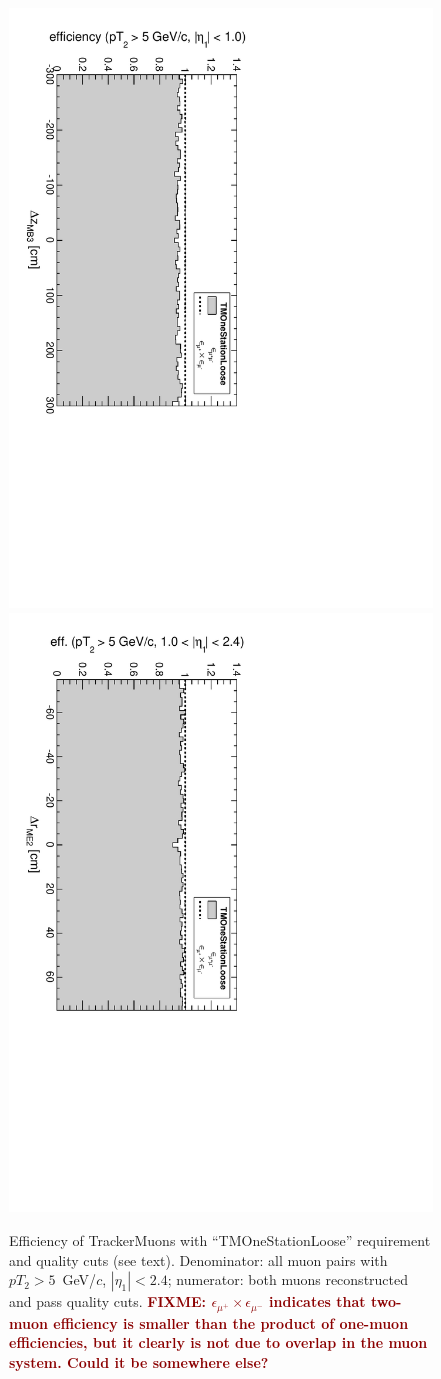 \documentclass[12pt]{article}
\newcommand{\fixme}[1]{\textcolor{darkred}{\bf FIXME: #1}}
\begin{document}
\begin{figure}
\includegraphics[height=0.5\linewidth, angle=90]{fig/acceptance8_plot/vsmb3dz_TMOneStationLoose.pdf}
\includegraphics[height=0.5\linewidth, angle=90]{fig/acceptance8_plot/vsme2dr_TMOneStationLoose.pdf}

\caption{Efficiency of TrackerMuons with ``TMOneStationLoose'' requirement and quality cuts (see text).  Denominator: all muon pairs with $pT_2 > 5$~GeV/$c$, $|\eta_1| < 2.4$; numerator: both muons reconstructed and pass quality cuts. \fixme{$\epsilon_{\mu^+} \times \epsilon_{\mu^-}$ indicates that two-muon efficiency is smaller than the product of one-muon efficiencies, but it clearly is not due to overlap in the muon system.  Could it be somewhere else?} \label{fig:efficiencies_TMOneStationLoose}}
\end{figure}
\end{document}
